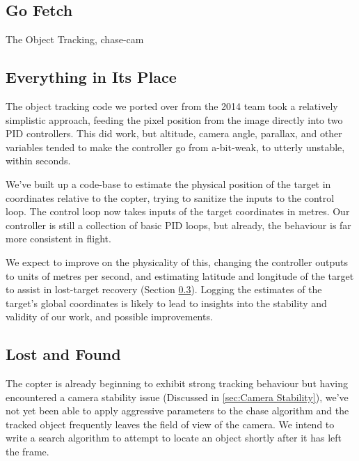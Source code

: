 \documentclass[11pt]{article}
\begin{document}
    \subsection{Go Fetch}
      The 
    Object Tracking, chase-cam 
    \subsection{Everything in Its Place}
      The object tracking code we ported over from the 2014 team took a relatively simplistic approach, feeding the pixel position from the image directly into two PID controllers.  This did work, but altitude, camera angle, parallax, and other variables tended to make the controller go from a-bit-weak, to utterly unstable, within seconds.

      We've built up a code-base to estimate the physical position of the target in coordinates relative to the copter, trying to sanitize the inputs to the control loop. The control loop now takes inputs of the target coordinates in metres.  Our controller is still a collection of basic PID loops, but already, the behaviour is far more consistent in flight.

      We expect to improve on the physicality of this, changing the controller outputs to units of metres per second, and estimating latitude and longitude of the target to assist in lost-target recovery (Section \ref{sec:Lost and Found}).  Logging the estimates of the target's global coordinates is likely to lead to insights into the stability and validity of our work, and possible improvements.


    \subsection{Lost and Found}
    \label{sec:Lost and Found}
      The copter is already beginning to exhibit strong tracking behaviour but having encountered a camera stability issue (Discussed in \ref{sec:Camera Stability}), we've not yet been able to apply aggressive parameters to the chase algorithm and the tracked object frequently leaves the field of view of the camera.
      We intend to write a search algorithm to attempt to locate an object shortly after it has left the frame.
\end{document}
